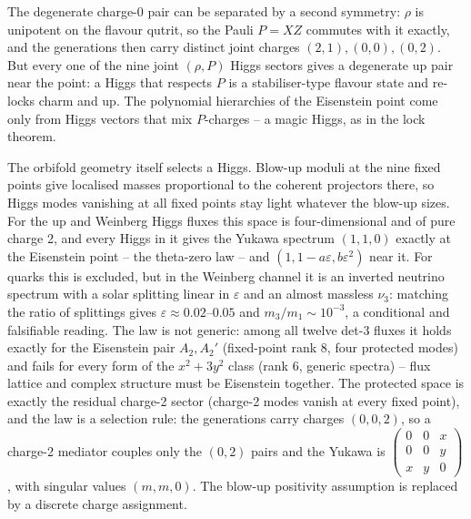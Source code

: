 The degenerate charge-0 pair can be separated by a second symmetry: $\rho$ is unipotent on the flavour qutrit, so the Pauli $P=XZ$ commutes with it exactly, and the generations then carry distinct joint charges $(2,1),(0,0),(0,2)$. But every one of the nine joint $(\rho,P)$ Higgs sectors gives a degenerate up pair near the point: a Higgs that respects $P$ is a stabiliser-type flavour state and re-locks charm and up. The polynomial hierarchies of the Eisenstein point come only from Higgs vectors that mix $P$-charges -- a magic Higgs, as in the lock theorem. 

The orbifold geometry itself selects a Higgs. Blow-up moduli at the nine fixed points give localised masses proportional to the coherent projectors there, so Higgs modes vanishing at all fixed points stay light whatever the blow-up sizes. For the up and Weinberg Higgs fluxes this space is four-dimensional and of pure charge 2, and every Higgs in it gives the Yukawa spectrum $(1,1,0)$ exactly at the Eisenstein point -- the theta-zero law -- and $(1,1-a\varepsilon,b\varepsilon^2)$ near it. For quarks this is excluded, but in the Weinberg channel it is an inverted neutrino spectrum with a solar splitting linear in $\varepsilon$ and an almost massless $\nu_3$: matching the ratio of splittings gives $\varepsilon\approx0.02$--$0.05$ and $m_3/m_1\sim10^{-3}$, a conditional and falsifiable reading.  The law is not generic: among all twelve det-3 fluxes it holds exactly for the Eisenstein pair $A_2,A_2'$ (fixed-point rank 8, four protected modes) and fails for every form of the $x^2+3y^2$ class (rank 6, generic spectra) -- flux lattice and complex structure must be Eisenstein together.  The protected space is exactly the residual charge-2 sector (charge-2 modes vanish at every fixed point), and the law is a selection rule: the generations carry charges $(0,0,2)$, so a charge-2 mediator couples only the $(0,2)$ pairs and the Yukawa is $\left(\begin{smallmatrix}0&0&x\\0&0&y\\x&y&0\end{smallmatrix}\right)$, with singular values $(m,m,0)$. The blow-up positivity assumption is replaced by a discrete charge assignment. 

